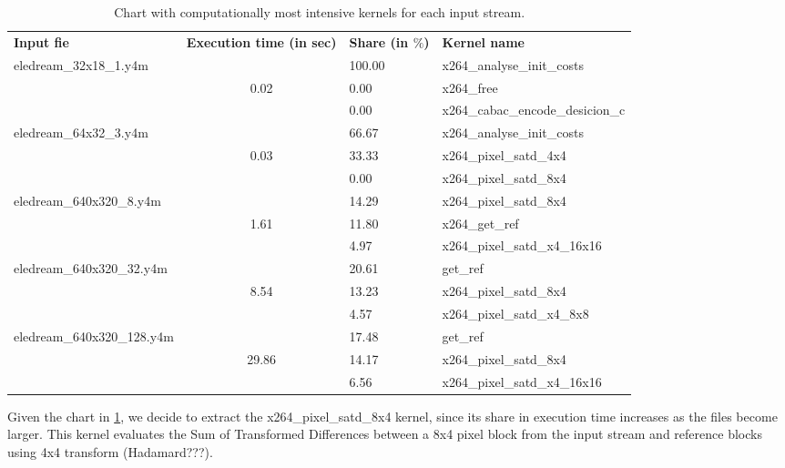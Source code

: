 \begin{table}[htb]%
\centering
	\begin{tabular}{|l|c|l|l|}
		\centering
		\bf{Input fie} & \bf{Execution time (in sec)} & \bf{Share (in $\%$)} & \bf{Kernel name} \\ \cline{1-4}
		\multirow{3}{*}{eledream\_32x18\_1.y4m}	&				& 100.00	& x264\_analyse\_init\_costs\\ 
																						&	0.02	& 0.00 		& x264\_free\\ 
																						&				& 0.00		& x264\_cabac\_encode\_desicion\_c\\ \cline{1-4}
		\multirow{3}{*}{eledream\_64x32\_3.y4m} & 			& 66.67		& x264\_analyse\_init\_costs\\
																						&	0.03	& 33.33 	& x264\_pixel\_satd\_4x4\\ 
																						&				& 0.00		& x264\_pixel\_satd\_8x4\\ \cline{1-4}
		\multirow{3}{*}{eledream\_640x320\_8.y4m}	& 			& 14.29	& x264\_pixel\_satd\_8x4\\ 
																							&	1.61	& 11.80 	& x264\_get\_ref\\ 
																							&				& 4.97		& x264\_pixel\_satd\_x4\_16x16\\ \cline{1-4}
		\multirow{3}{*}{eledream\_640x320\_32.y4m}& 			& 20.61	& get\_ref\\ 
																							& 8.54	& 13.23 	& x264\_pixel\_satd\_8x4\\ 
																							&				& 4.57		& x264\_pixel\_satd\_x4\_8x8\\ \cline{1-4}
		\multirow{3}{*}{eledream\_640x320\_128.y4m}&			& 17.48	& get\_ref\\
																							&	 29.86& 14.17 	& x264\_pixel\_satd\_8x4\\
																							&				& 6.56		& x264\_pixel\_satd\_x4\_16x16\\ \cline{1-4}
	\end{tabular}	

\caption{Chart with computationally most intensive kernels for each input stream.}
\label{tab:chart}
\end{table}

Given the chart in \ref{tab:chart}, we decide to extract the x264\_pixel\_satd\_8x4 kernel, since its share in execution time increases as the files become larger. This kernel evaluates the Sum of Transformed Differences between a 8x4 pixel block from the input stream and reference blocks using 4x4 transform (Hadamard???).

